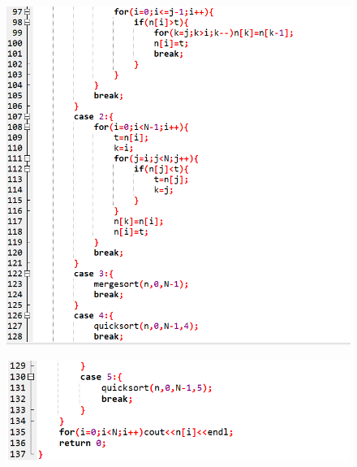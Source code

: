 \documentclass[12pt]{article}
\begin{document}
\begin{figure}[H]
\centering
\includegraphics[scale=0.6]{P11.png}
\end{figure}
\begin{figure}[H]
\centering
\includegraphics[scale=0.6]{P12.png}
\end{figure}
\end{document}
